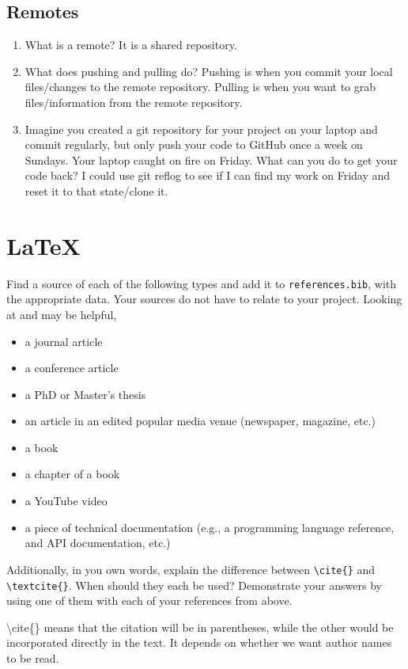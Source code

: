 \documentclass[10pt,twocolumn]{article}
\begin{document}
\subsection{Remotes}

\begin{enumerate}
\item What is a remote?
It is a shared repository.
\item What does pushing and pulling do?
Pushing is when you commit your local files/changes to the remote repository. Pulling is when you want to grab files/information from the remote repository.
\item Imagine you created a git repository for your project on your laptop and commit regularly, but only push your code to GitHub once a week on Sundays. Your laptop caught on fire on Friday. What can you do to get your code back?
I could use git reflog to see if I can find my work on Friday and reset it to that state/clone it.


\end{enumerate}

\section{\LaTeX}

Find a source of each of the following types and add it to \texttt{references.bib}, with the appropriate data. Your sources do not have to relate to your project. Looking at \textcite{OverleafBibliographyManagement} and \textcite{WikipediaBibtex} may be helpful,

\begin{itemize}
\item a journal article
\item a conference article
\item a PhD or Master's thesis
\item an article in an edited popular media venue (newspaper, magazine, etc.)
\item a book
\item a chapter of a book
\item a YouTube video
\item a piece of technical documentation (e.g., a programming language reference, and API documentation, etc.)

\textcite{Riordan_2005}
\cite{LAT_2025}
\cite{Hu_2023}
\cite{Du_et_al}
\cite{Chačatrjan_2016}
\cite{Carlino_2024}
\cite{Zhang_2018}


\end{itemize}
 
Additionally, in you own words, explain the difference between \texttt{{\textbackslash}cite\{\}} and \texttt{{\textbackslash}textcite\{\}}. When should they each be used? Demonstrate your answers by using one of them with each of your references from above.

{\textbackslash}cite\{\} means that the citation will be in parentheses, while the other would be incorporated directly in the text. It depends on whether we want author names to be read.

\printbibliography
\end{document}
